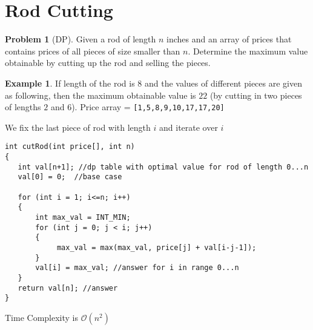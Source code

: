 \documentclass[twoside,12pt,a4paper,english]{book}
\theoremstyle{definition}
\newtheorem*{exmp}{Example}
\theoremstyle{problemstyle}
\newtheorem*{problem}{Problem} %
\theoremstyle{problemstyle}
\theoremstyle{problemstyle}
\begin{document}
\section{Rod Cutting}
\begin{problem}[DP]
Given a rod of length $n$ inches and an array of prices that contains prices of all pieces of size smaller than $n$. Determine the maximum value obtainable by cutting up the rod and selling the pieces.
\end{problem}
\begin{exmp}
If length of the rod is $8$ and the values of different pieces are given as following, then the maximum obtainable value is $22$ (by cutting in two pieces of lengths $2$ and $6$).
Price  array = \texttt{[1,5,8,9,10,17,17,20]}
\end{exmp}
\begin{tcolorbox}[title=Solution]

We fix the last piece of rod with length $i$ and iterate over $i$
\begin{lstlisting}
int cutRod(int price[], int n)
{
   int val[n+1]; //dp table with optimal value for rod of length 0...n
   val[0] = 0;  //base case

   for (int i = 1; i<=n; i++)
   {
       int max_val = INT_MIN;
       for (int j = 0; j < i; j++)
       {
            max_val = max(max_val, price[j] + val[i-j-1]);
       }
       val[i] = max_val; //answer for i in range 0...n
   }
   return val[n]; //answer
}
\end{lstlisting}
Time Complexity is $\mathcal{O}(n^2)$
\end{tcolorbox}
\newpage
\end{document}
